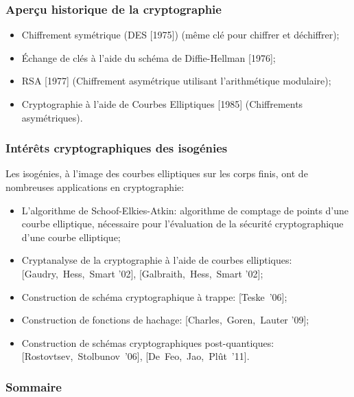 \documentclass[10pt,a4paper]{beamer}
\theoremstyle{plain}
\theoremstyle{definition}
\theoremstyle{definition}
\theoremstyle{definition}
\theoremstyle{definition}
\theoremstyle{remark}
\theoremstyle{remark}
\theoremstyle{definition}
\newcommand{\bluebox}[2]{
\setbeamercolor{upperblue}{fg=white,bg=blue}
\setbeamercolor{lowercol}{fg=black,bg=pacificcream}

\begin{beamerboxesrounded}[upper=upperblue,lower=lowercol,shadow=true]{
#1 }  #2
\end{beamerboxesrounded} }
\begin{document}
\begin{frame}
\frametitle{Aperçu historique de la cryptographie}

\begin{itemize}
\item Chiffrement symétrique (DES [1975]) (même clé pour chiffrer et déchiffrer);
\item \'Echange de clés à l'aide du schéma de Diffie-Hellman [1976];
\item RSA [1977] (Chiffrement asymétrique utilisant l'arithmétique modulaire);
\item Cryptographie à l'aide de Courbes Elliptiques [1985] (Chiffrements asymétriques).
\end{itemize}
\end{frame}

\begin{frame}
\frametitle{Intérêts cryptographiques des isogénies}

Les isogénies, à l'image des courbes elliptiques sur les corps finis, ont de nombreuses 
applications en cryptographie: 
\begin{itemize}
\item L'algorithme de Schoof-Elkies-Atkin: algorithme de comptage de points
d'une courbe elliptique, nécessaire pour l'évaluation de la sécurité 
cryptographique d'une courbe elliptique;
\pause
\item Cryptanalyse de la cryptographie à l'aide de courbes elliptiques: [Gaudry,~Hess,~Smart '02], [Galbraith,~Hess,~Smart '02];
\pause
\item Construction de schéma cryptographique à trappe: [Teske~'06];
\pause
\item Construction de fonctions de hachage: [Charles,~Goren,~Lauter '09];
\pause
\item Construction de schémas cryptographiques post-quantiques: [Rostovtsev,~Stolbunov~'06], [De~Feo,~Jao,~Pl\^ut~'11].
\end{itemize}
\end{frame}

\begin{frame}
\frametitle{Sommaire}
\tableofcontents
\end{frame}

\end{document}
